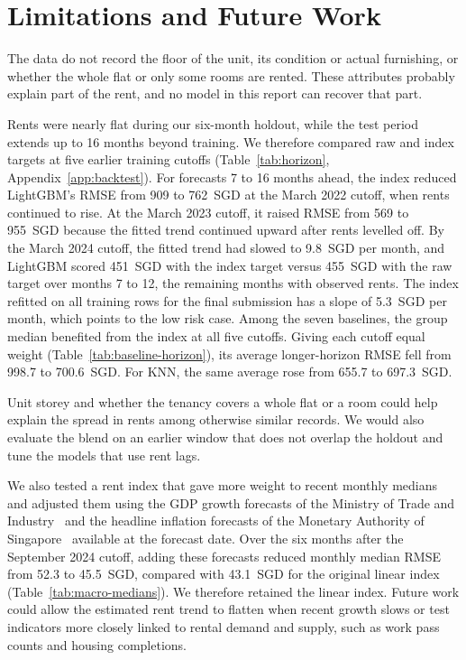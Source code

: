 \section{Limitations and Future Work}\label{sec:limitations}

The data do not record the floor of the unit, its condition or actual furnishing, or whether the whole flat or only some rooms are rented. These attributes probably explain part of the rent, and no model in this report can recover that part.

Rents were nearly flat during our six-month holdout, while the test period extends up to 16 months beyond training. We therefore compared raw and index targets at five earlier training cutoffs (Table~\ref{tab:horizon}, Appendix~\ref{app:backtest}). For forecasts 7 to 16 months ahead, the index reduced LightGBM's RMSE from 909 to 762~SGD at the March 2022 cutoff, when rents continued to rise. At the March 2023 cutoff, it raised RMSE from 569 to 955~SGD because the fitted trend continued upward after rents levelled off. By the March 2024 cutoff, the fitted trend had slowed to 9.8~SGD per month, and LightGBM scored 451~SGD with the index target versus 455~SGD with the raw target over months 7 to 12, the remaining months with observed rents. The index refitted on all training rows for the final submission has a slope of 5.3~SGD per month, which points to the low risk case. Among the seven baselines, the group median benefited from the index at all five cutoffs. Giving each cutoff equal weight (Table~\ref{tab:baseline-horizon}), its average longer-horizon RMSE fell from 998.7 to 700.6~SGD. For KNN, the same average rose from 655.7 to 697.3~SGD.

Unit storey and whether the tenancy covers a whole flat or a room could help explain the spread in rents among otherwise similar records. We would also evaluate the blend on an earlier window that does not overlap the holdout and tune the models that use rent lags.

We also tested a rent index that gave more weight to recent monthly medians and adjusted them using the GDP growth forecasts of the Ministry of Trade and Industry~\cite{mti_gdp_forecasts} and the headline inflation forecasts of the Monetary Authority of Singapore~\cite{mas_mps} available at the forecast date. Over the six months after the September 2024 cutoff, adding these forecasts reduced monthly median RMSE from 52.3 to 45.5~SGD, compared with 43.1~SGD for the original linear index (Table~\ref{tab:macro-medians}). We therefore retained the linear index. Future work could allow the estimated rent trend to flatten when recent growth slows or test indicators more closely linked to rental demand and supply, such as work pass counts and housing completions.
